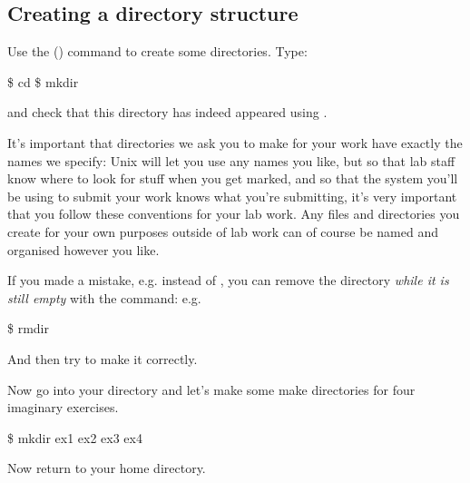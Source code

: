 \subsection{Creating a directory structure}

Use the  () command
to create some directories. Type:

\begin{ttoutenv}
\$  cd
\$  mkdir \crsname\return
\end{ttoutenv}
%
and check that this directory has indeed appeared using .

It's important that directories we ask you to make for your work have
exactly the names we specify: Unix will let you use any names you
like, but so that lab staff know where to look for stuff when you get marked, and so that the system you'll be using to submit your work knows what you're submitting, it's very important that you follow these conventions for your lab work. Any files and directories you create for your own purposes outside of lab work can of course be named and organised however you like.

If you made a mistake, e.g. \fname{\crsnamelc} instead of \fname{\crsname},
you can remove the directory \textit{while it is still empty} with the
 command: e.g.
%
\begin{ttoutenv}
\$  rmdir \crsnamelc\return
\end{ttoutenv}
%
And then try to make it correctly.

  
Now go into your  directory and let's make some make directories for four imaginary \crsname{} exercises.

\begin{ttoutenv}
\$  mkdir ex1 ex2 ex3 ex4\return
\end{ttoutenv}
%
%
%
Now return to your home directory.

